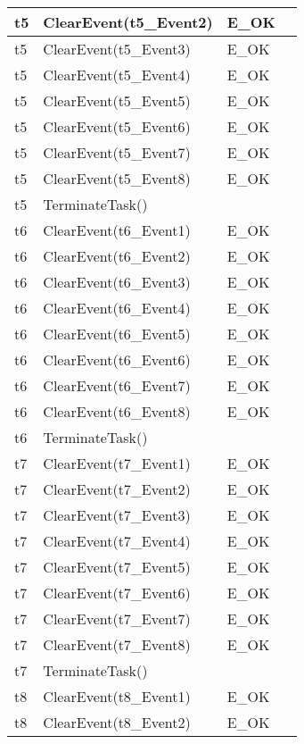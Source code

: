 \documentclass[10pt]{article}
\newlength{\Li}\settowidth{\Li}{Running}
\newlength{\Lii}\setlength{\Lii}{7cm}
\newlength{\Liiii}\setlength{\Liiii}{0.9cm}
\newlength{\Liii}\setlength{\Liii}{\textwidth} \addtolength{\Liii}{-\Li} \addtolength{\Liii}{-\Lii} \addtolength{\Liii}{-\Liiii}
\begin{document}
\begin{supertabular}{|p{\Li}|p{\Lii}|p{\Liii}|p{\Liiii}|}
	t5	& ClearEvent(t5\_Event2)		& E\_OK				& \\ \hline 
	t5	& ClearEvent(t5\_Event3)		& E\_OK				& \\ \hline 
	t5	& ClearEvent(t5\_Event4)		& E\_OK				& \\ \hline 
	t5	& ClearEvent(t5\_Event5)		& E\_OK				& \\ \hline 
	t5	& ClearEvent(t5\_Event6)		& E\_OK				& \\ \hline 
	t5	& ClearEvent(t5\_Event7)		& E\_OK				& \\ \hline 
	t5	& ClearEvent(t5\_Event8)		& E\_OK				& \\ \hline 
	t5	& TerminateTask()				&					&  \\ \hline
	t6	& ClearEvent(t6\_Event1)		& E\_OK				& \\ \hline 
	t6	& ClearEvent(t6\_Event2)		& E\_OK				& \\ \hline 
	t6	& ClearEvent(t6\_Event3)		& E\_OK				& \\ \hline 
	t6	& ClearEvent(t6\_Event4)		& E\_OK				& \\ \hline 
	t6	& ClearEvent(t6\_Event5)		& E\_OK				& \\ \hline 
	t6	& ClearEvent(t6\_Event6)		& E\_OK				& \\ \hline 
	t6	& ClearEvent(t6\_Event7)		& E\_OK				& \\ \hline 
	t6	& ClearEvent(t6\_Event8)		& E\_OK				& \\ \hline 
	t6	& TerminateTask()				&					&  \\ \hline
	t7	& ClearEvent(t7\_Event1)		& E\_OK				& \\ \hline 
	t7	& ClearEvent(t7\_Event2)		& E\_OK				& \\ \hline 
	t7	& ClearEvent(t7\_Event3)		& E\_OK				& \\ \hline 
	t7	& ClearEvent(t7\_Event4)		& E\_OK				& \\ \hline 
	t7	& ClearEvent(t7\_Event5)		& E\_OK				& \\ \hline 
	t7	& ClearEvent(t7\_Event6)		& E\_OK				& \\ \hline 
	t7	& ClearEvent(t7\_Event7)		& E\_OK				& \\ \hline 
	t7	& ClearEvent(t7\_Event8)		& E\_OK				& \\ \hline 
	t7	& TerminateTask()				&					&  \\ \hline
	t8	& ClearEvent(t8\_Event1)		& E\_OK				& \\ \hline 
	t8	& ClearEvent(t8\_Event2)		& E\_OK				& \\ \hline 

\end{supertabular}
\end{document}

